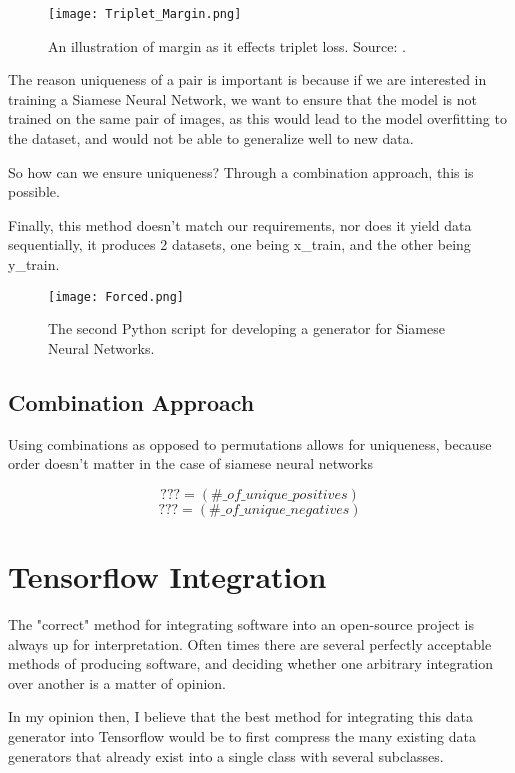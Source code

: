 \documentclass[
	letterpaper, %
	10pt, %
	unnumberedsections, %
	twoside, %
]{LTJournalArticle}
\begin{document}
\begin{figure} %
	\texttt{[image: Triplet\_Margin.png]}
	\caption{An illustration of margin as it effects triplet loss. Source: \autocite{yusuf_sar}.}
	\label{fig:triplet_margin}
\end{figure}

The reason uniqueness of a pair is important is because if we are interested in training a Siamese Neural Network, we want to ensure that the model is not trained on the same pair of images, as this would lead to the model overfitting to the dataset, and would not be able to generalize well to new data.

So how can we ensure uniqueness? Through a combination approach, this is possible.

Finally, this method doesn't match our requirements, nor does it yield data sequentially, it produces 2 datasets, one being x\_train, and the other being y\_train.

\begin{figure*}[hbt!] %
	\centering
    \texttt{[image: Forced.png]}
	\caption{The second Python script for developing a generator for Siamese Neural Networks.}
	\label{fig:forced}
\end{figure*}

\subsection{Combination Approach}

Using combinations as opposed to permutations allows for uniqueness, because order doesn't matter in the case of siamese neural networks

\[ ??? = (\#\_of\_unique\_positives) \]
\[ ??? = (\#\_of\_unique\_negatives) \]

\section{Tensorflow Integration}
The "correct" method for integrating software into an open-source project is always up for interpretation. Often times there are several perfectly acceptable methods of producing software, and deciding whether one arbitrary integration over another is a matter of opinion.

In my opinion then, I believe that the best method for integrating this data generator into Tensorflow would be to first compress the many existing data generators that already exist into a single class with several subclasses.
\end{document}
